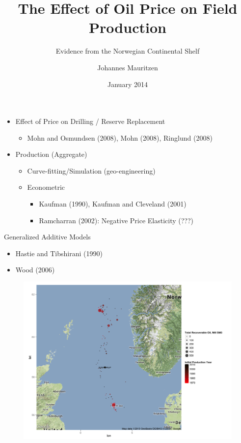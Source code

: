 \documentclass{beamer}
\title[OIL]{The Effect of Oil Price on Field Production}
\subtitle[Errors]{Evidence from the Norwegian Continental Shelf}
\author[J. Mauritzen]{Johannes Mauritzen}
\institute[NHH]{
  \texttt{johannes.mauritzen@nhh.edu}
}
\date[Jan 2014]{January 2014}
\begin{document}
\begin{frame}[plain]
  \titlepage
\end{frame}




\begin{frame}[plain]
	\begin{itemize}

	\item Effect of Price on Drilling / Reserve Replacement
	\begin{itemize} \item Mohn and Osmundsen (2008), Mohn (2008), Ringlund (2008) \end{itemize}
	 \item Production (Aggregate)

		\begin{itemize}
		\item Curve-fitting/Simulation (geo-engineering)
		\item Econometric
			\begin{itemize}
			\item Kaufman (1990), Kaufman and Cleveland (2001)
			\item Ramcharran (2002):  Negative Price Elasticity (???)
	 		\end{itemize}
	 	\end{itemize}
	\end{itemize}
\end{frame}

\begin{frame}[plain]
Generalized Additive Models
\begin{itemize}
\item  Hastie and Tibshirani (1990) 
\item  Wood (2006)
\end {itemize}

\end{frame}

\begin{frame}[plain]
	\begin{figure}
	\includegraphics[width=.8\textwidth]{north_sea_reserves.png}
	\caption{}
	\label{north_sea_reserves}
	\end{figure}
\end{frame}
\end{document}

